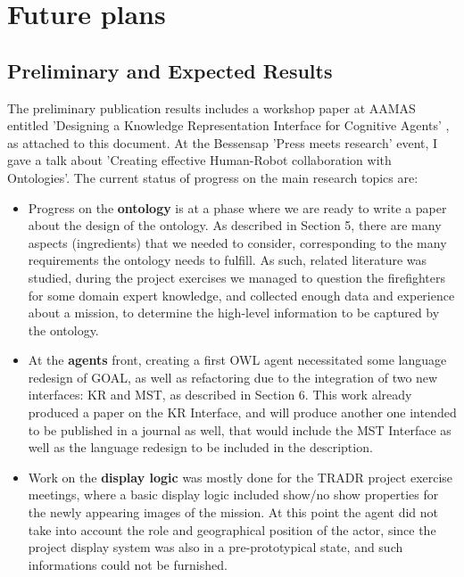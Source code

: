 \section{Future plans}
\subsection{Preliminary and Expected Results}

The preliminary publication results includes a workshop paper at AAMAS entitled 'Designing a Knowledge Representation Interface for Cognitive Agents' \cite{}, as attached to this document. 
At the Bessensap 'Press meets research' event, I gave a talk about 'Creating effective Human-Robot collaboration with Ontologies'. 
The current status of progress on the main research topics are: 
\begin{itemize}
\item Progress on the \textbf{ontology} is at a phase where we are ready to write a paper about the design of the ontology. As described in Section 5, there are many aspects (ingredients) that we needed to consider, corresponding to the many requirements the ontology needs to fulfill. As such, related literature was studied, during the project exercises we managed to question the firefighters for some domain expert knowledge, and collected enough data and experience about a mission, to determine the high-level information to be captured by the ontology. 
\item At the \textbf{agents} front, creating a first OWL agent necessitated some language redesign of GOAL, as well as refactoring due to the integration of two new interfaces: KR and MST, as described in Section 6. This work already produced a paper on the KR Interface, and will produce another one intended to be published in a journal as well, that would include the MST Interface as well as the language redesign to be included in the description. 
\item Work on the \textbf{display logic} was mostly done for the TRADR project exercise meetings, where a basic display logic included show/no show properties for the newly appearing images of the mission. At this point the agent did not take into account the role and geographical position of the actor, since the project display system was also in a pre-prototypical state, and such informations could not be furnished. 
\end{itemize}


